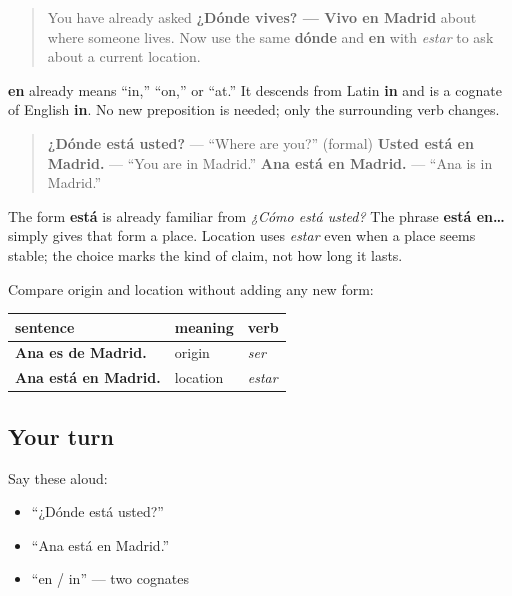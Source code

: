 \begin{quote}
You have already asked \textbf{¿Dónde vives? — Vivo en Madrid} about where someone lives. Now use the same \textbf{dónde} and \textbf{en} with \emph{estar} to ask about a current location.
\end{quote}

\begin{cousinweb}
\textbf{en} already means “in,” “on,” or “at.” It descends from Latin \textbf{in} and is a cognate of English \textbf{in}. No new preposition is needed; only the surrounding verb changes.
\end{cousinweb}

\begin{grammarlens}[title={Grammar Lens: dónde + estar, then estar + en}]
\begin{quote}
\textbf{¿Dónde está usted?} — “Where are you?” (formal) \textbf{Usted está en Madrid.} — “You are in Madrid.” \textbf{Ana está en Madrid.} — “Ana is in Madrid.”
\end{quote}

The form \textbf{está} is already familiar from \emph{¿Cómo está usted?} The phrase \textbf{está en…} simply gives that form a place. Location uses \emph{estar} even when a place seems stable; the choice marks the kind of claim, not how long it lasts.

Compare origin and location without adding any new form:

\noindent
\begin{tabularx}{\linewidth}{@{}>{\raggedright\arraybackslash}X>{\raggedright\arraybackslash}X>{\raggedright\arraybackslash}X@{}}
\toprule
\textbf{sentence} & \textbf{meaning} & \textbf{verb} \\
\midrule
\textbf{Ana es de Madrid.} & origin & \emph{ser} \\
\textbf{Ana está en Madrid.} & location & \emph{estar} \\
\bottomrule
\end{tabularx}
\end{grammarlens}

\subsection*{Your turn}
Say these aloud:

\begin{itemize}
\raggedright
  \item “¿Dónde está usted?”
  \item “Ana está en Madrid.”
  \item “en / in” — two cognates
\end{itemize}

